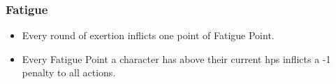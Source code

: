 \subsubsection*{Fatigue}
\begin{itemize}
  \item
  Every round of exertion inflicts one point of Fatigue Point.
  \item
  Every Fatigue Point a character has above their current \glspl{hp} inflicts a -1 penalty to all actions.
\end{itemize}
